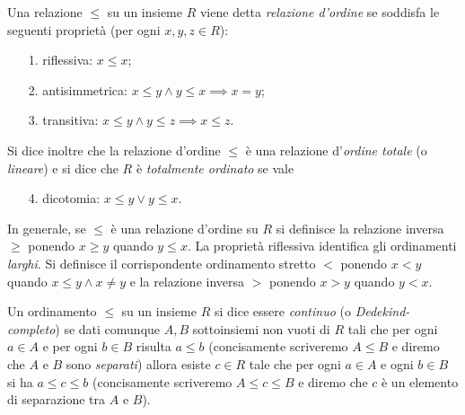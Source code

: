 \begin{definition}
  \label{def:ordine}%
  Una relazione
  $\le$ su un insieme $R$ viene detta
  \emph{relazione d'ordine}%
%
  se soddisfa le seguenti proprietà (per ogni $x,y,z\in R$):
  \begin{enumerate}
    \item[1.] riflessiva: $x\le x$;
    \item[2.] antisimmetrica: $x\le y \land y\le x \implies x=y$;
    \item[3.] transitiva: $x\le y \land y\le z \implies x\le z$.
  \end{enumerate}
  Si dice inoltre che la relazione d'ordine $\le$
  è una relazione d'\emph{ordine totale}
%
  (o \emph{lineare}) 
  e si dice che $R$ è \emph{totalmente ordinato} se vale
  \begin{enumerate}
    \item[4.] dicotomia: $x\le y \lor y\le x$.
  \end{enumerate}
\end{definition}

In generale, se $\le$ è una relazione d'ordine su $R$ si definisce la 
relazione inversa $\ge$ ponendo $x\ge y$ quando $y\le x$.
La proprietà riflessiva identifica gli ordinamenti \emph{larghi}.
Si definisce il corrispondente ordinamento stretto $<$
ponendo $x < y$ quando $x\le y \land x\neq y$
e la relazione inversa $>$ ponendo $x>y$ quando $y<x$.

\begin{definition}
  \label{def:ordinamento_continuo}%
  Un ordinamento $\le$ su un insieme $R$ si dice essere
  \emph{continuo}%
%
  (o \emph{Dedekind-completo})
  se dati comunque $A,B$ sottoinsiemi non vuoti di $R$
    tali che per ogni $a\in A$ e per ogni $b\in B$ risulta $a\le b$
    (concisamente scriveremo $A\le B$ e diremo che $A$ e $B$ sono 
    \emph{separati})
    allora esiste $c\in R$ tale che per ogni $a\in A$ e ogni $b\in B$ 
    si ha $a\le c \le b$ (concisamente scriveremo $A\le c \le B$
    e diremo che $c$ è un elemento di separazione tra $A$ e $B$).
\end{definition}

